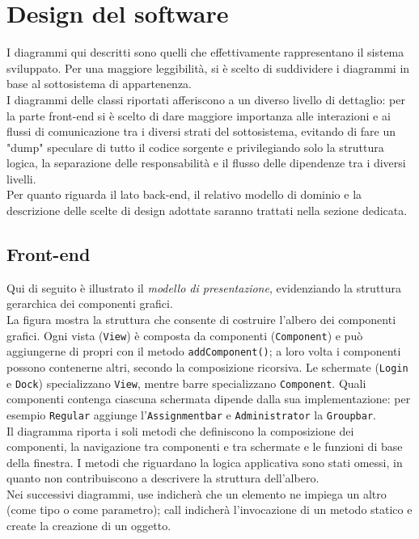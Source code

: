 \chapter{Design del software} %

I diagrammi qui descritti sono quelli che effettivamente rappresentano il sistema sviluppato. 
Per una maggiore leggibilità, si è scelto di suddividere i diagrammi in base al sottosistema 
di appartenenza. \\
\indent I diagrammi delle classi riportati afferiscono a un diverso livello di dettaglio: 
per la parte front-end si è scelto di dare maggiore importanza alle interazioni e ai flussi 
di comunicazione tra i diversi strati del sottosistema, evitando di fare un "dump" speculare di tutto il codice sorgente e privilegiando solo la struttura logica, la separazione delle responsabilità e il flusso delle dipendenze tra i diversi livelli. \\
\indent Per quanto riguarda il lato back-end, il relativo modello di dominio e la descrizione delle
scelte di design adottate saranno trattati 
nella sezione dedicata. 

\section{Front-end}

Qui di seguito è illustrato il \textit{modello di presentazione}, evidenziando la struttura gerarchica dei componenti grafici. \\
\indent La figura 
mostra la struttura che consente di costruire l’albero dei componenti grafici. 
Ogni vista (\texttt{View}) è composta da componenti (\texttt{Component}) e può 
aggiungerne di propri con il metodo \texttt{addComponent()}; a loro volta i 
componenti possono contenerne altri, secondo la composizione ricorsiva. 
Le schermate (\texttt{Login} e \texttt{Dock}) specializzano \texttt{View}, 
mentre barre specializzano \texttt{Component}. Quali componenti contenga 
ciascuna schermata dipende dalla sua implementazione: per esempio \texttt{Regular} 
aggiunge l’\texttt{Assignmentbar} e \texttt{Administrator} la \texttt{Groupbar}. \\
\indent Il diagramma riporta i soli metodi che definiscono la composizione dei componenti, la 
navigazione tra componenti e tra schermate e le funzioni di base della finestra.
I metodi che riguardano la logica applicativa sono stati omessi, 
in quanto non contribuiscono a descrivere la struttura dell’albero. \\
\indent Nei successivi diagrammi, \guillemotleft use\guillemotright{} indicherà che
 un elemento ne impiega un altro (come tipo o come parametro);
  \guillemotleft call\guillemotright{} indicherà l'invocazione di un metodo statico e \guillemotleft create\guillemotright{} la creazione di
   un oggetto.

